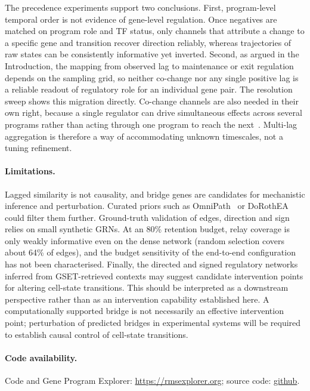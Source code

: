 \documentclass[10pt, letterpaper]{article}
\begin{document}
The precedence experiments support two conclusions. First, program-level temporal order is not evidence of gene-level regulation. Once negatives are matched on program role and TF status, only channels that attribute a change to a specific gene and transition recover direction reliably, whereas trajectories of raw states can be consistently informative yet inverted. Second, as argued in the Introduction, the mapping from observed lag to maintenance or exit regulation depends on the sampling grid, so neither co-change nor any single positive lag is a reliable readout of regulatory role for an individual gene pair. The resolution sweep shows this migration directly. Co-change channels are also needed in their own right, because a single regulator can drive simultaneous effects across several programs rather than acting through one program to reach the next~\cite{ota2026causal}. Multi-lag aggregation is therefore a way of accommodating unknown timescales, not a tuning refinement.

\paragraph{Limitations.} Lagged similarity is not causality, and bridge genes are candidates for mechanistic inference and perturbation. Curated priors such as OmniPath~\cite{turei2021omnipath} or DoRothEA~\cite{garciaalonso2019dorothea} could filter them further. Ground-truth validation of edges, direction and sign relies on small synthetic GRNs. At an 80\% retention budget, relay coverage is only weakly informative even on the dense network (random selection covers about 64\% of edges), and the budget sensitivity of the end-to-end configuration has not been characterised. 
Finally, the directed and signed regulatory networks inferred from GSET-retrieved contexts may suggest candidate intervention points for altering cell-state transitions. This should be interpreted as a downstream perspective rather than as an intervention capability established here. A computationally supported bridge is not necessarily an effective intervention point; perturbation of predicted bridges in experimental systems will be required to establish causal control of cell-state transitions.

\paragraph{Code availability.} Code and Gene Program Explorer: \url{https://rmsexplorer.org}; source code: \url{github}.
\end{document}
